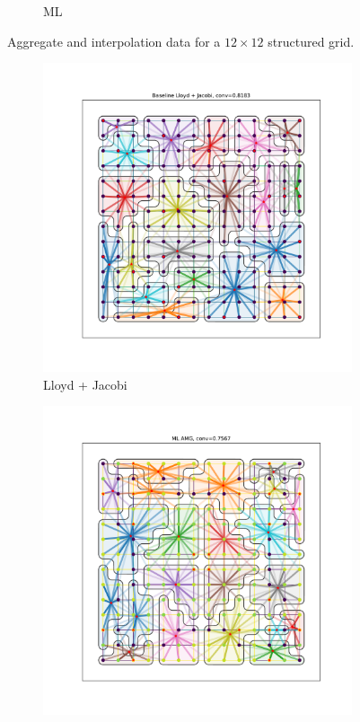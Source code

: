 \documentclass{article}
\begin{document}
\begin{figure}[h]
\begin{subfigure}[t]{0.49\textwidth}
    \caption{ML}
  \end{subfigure}
  \caption{Aggregate and interpolation data for a $12 \times 12$ structured grid.}
  \label{fig:grid12}
\end{figure}
\begin{figure}[h]
  \centering
  \begin{subfigure}[t]{0.49\textwidth}
    \centering
    \includegraphics[width=\textwidth]{grid_14_lloyd.pdf}
    \caption{Lloyd + Jacobi}
  \end{subfigure}
  \begin{subfigure}[t]{0.49\textwidth}
    \centering
    \includegraphics[width=\textwidth]{grid_14_ml.pdf}

\end{subfigure}
\end{figure}
\end{document}
